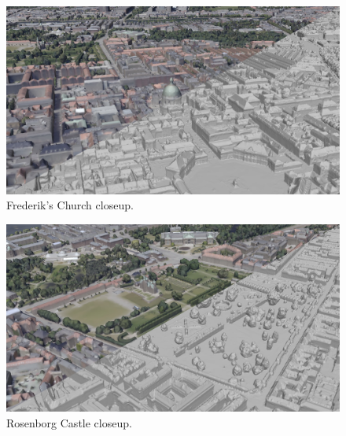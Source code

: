 \documentclass[10pt,letterpaper]{article}
\begin{document}
\begin{figure}
    \centering
    \capstart
    \begin{minipage}[b]{1.0\linewidth}
        \includegraphics[width=\textwidth]{images/copenhagen/results/closeups/diag/frederiks_church_diag.jpg}
    \end{minipage}
    \caption{Frederik's Church closeup.}
    \label{fig:closeup_frederik_church}
\end{figure}

\begin{figure}
    \centering
    \capstart
    \begin{minipage}[b]{1.0\linewidth}
        \includegraphics[width=\textwidth]{images/copenhagen/results/closeups/diag/rosenborg_castle_diag.jpg}
    \end{minipage}
    \caption{Rosenborg Castle closeup.}
    \label{fig:closeup_rosenborg_castle}
\end{figure}
\end{document}
